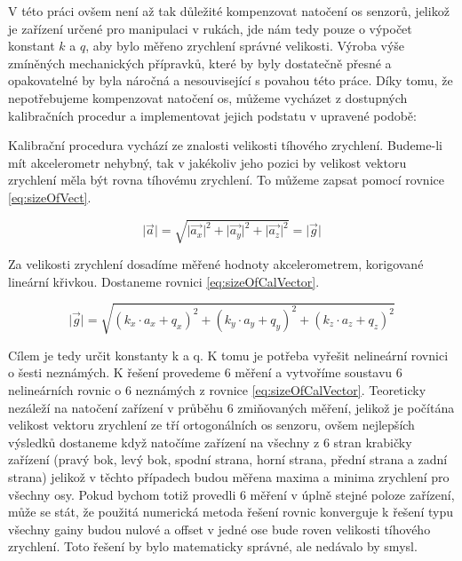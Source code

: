 V této práci ovšem není až tak důležité kompenzovat natočení os senzorů, jelikož je zařízení určené pro manipulaci v rukách, jde nám tedy pouze o výpočet konstant $ k $ a $ q $, aby bylo měřeno zrychlení správné velikosti. Výroba výše zmíněných mechanických přípravků, které by byly dostatečně přesné a opakovatelné by byla náročná a nesouvisející s povahou této práce. Díky tomu, že nepotřebujeme kompenzovat natočení os, můžeme vycházet z dostupných kalibračních procedur a implementovat jejich podstatu v upravené podobě:

Kalibrační procedura vychází ze znalosti velikosti tíhového zrychlení. Budeme-li mít akcelerometr nehybný, tak v jakékoliv jeho pozici by velikost vektoru zrychlení měla být rovna tíhovému zrychlení. To můžeme zapsat pomocí rovnice \ref{eq:sizeOfVect}.

\begin{equation} \label{eq:sizeOfVect}
\lvert\vec{a}\rvert=\sqrt{\lvert\vec{a_{x}}\rvert^{2}+\lvert\vec{a_{y}}\rvert^{2}+\lvert\vec{a_{z}}\rvert^{2}}=\lvert\vec{g}\rvert
\end{equation} 

Za velikosti zrychlení dosadíme měřené hodnoty akcelerometrem, korigované lineární křivkou. Dostaneme rovnici \ref{eq:sizeOfCalVector}.

\begin{equation} \label{eq:sizeOfCalVector}
\lvert\vec{g}\rvert=\sqrt{(k_{x}\cdot a_{x} + q_{x})^{2}+(k_{y}\cdot a_{y} + q_{y})^{2}+(k_{z}\cdot a_{z} + q_{z})^{2}}
\end{equation} 

Cílem je tedy určit konstanty k a q. K tomu je potřeba vyřešit nelineární rovnici o šesti neznámých. K řešení provedeme 6 měření a vytvoříme soustavu 6 nelineárních rovnic o 6 neznámých z rovnice \ref{eq:sizeOfCalVector}. Teoreticky nezáleží na natočení zařízení v průběhu 6 zmiňovaných měření, jelikož je počítána velikost vektoru zrychlení ze tří ortogonálních os senzoru, ovšem nejlepších výsledků dostaneme když natočíme zařízení na všechny z 6 stran krabičky zařízení (pravý bok, levý bok, spodní strana, horní strana, přední strana a zadní strana) jelikož v těchto případech budou měřena maxima a minima zrychlení pro všechny osy. Pokud bychom totiž provedli 6 měření v úplně stejné poloze zařízení, může se stát, že použitá numerická metoda řešení rovnic konverguje k řešení typu všechny gainy budou nulové a offset v jedné ose bude roven velikosti tíhového zrychlení. Toto řešení by bylo matematicky správné, ale nedávalo by smysl.

